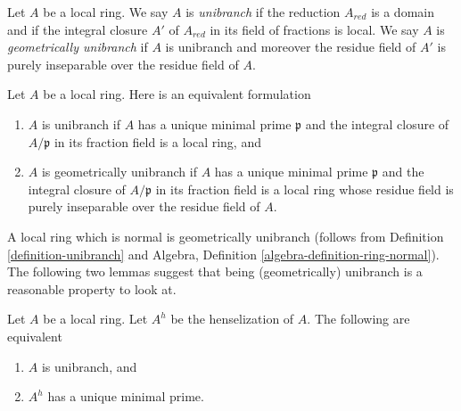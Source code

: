 \begin{definition}
\label{definition-unibranch}
\begin{reference}
\cite[Chapter 0 (23.2.1)]{EGA4}
\end{reference}
Let $A$ be a local ring. We say $A$ is {\it unibranch}
if the reduction $A_{red}$ is a domain and if the integral closure
$A'$ of $A_{red}$ in its field of fractions is local.
We say $A$ is {\it geometrically unibranch} if $A$ is unibranch
and moreover the residue field of $A'$ is purely inseparable over
the residue field of $A$.
\end{definition}

\noindent
Let $A$ be a local ring. Here is an equivalent formulation
\begin{enumerate}
\item $A$ is unibranch if $A$ has a unique minimal prime $\mathfrak p$ and
the integral closure of $A/\mathfrak p$ in its fraction field is a
local ring, and
\item $A$ is geometrically unibranch if $A$ has a unique minimal prime
$\mathfrak p$ and the integral closure of $A/\mathfrak p$ in its
fraction field is a local ring whose residue field is purely inseparable
over the residue field of $A$.
\end{enumerate}
A local ring which is normal is geometrically unibranch
(follows from Definition \ref{definition-unibranch} and
Algebra, Definition \ref{algebra-definition-ring-normal}).
The following two lemmas suggest that being (geometrically) unibranch
is a reasonable property to look at.

\begin{lemma}
\label{lemma-unibranch}
\begin{reference}
\cite[Chapter IV Proposition 18.6.12]{EGA4}
\end{reference}
Let $A$ be a local ring. Let $A^h$ be the henselization of $A$.
The following are equivalent
\begin{enumerate}
\item $A$ is unibranch, and
\item $A^h$ has a unique minimal prime.
\end{enumerate}
\end{lemma}

